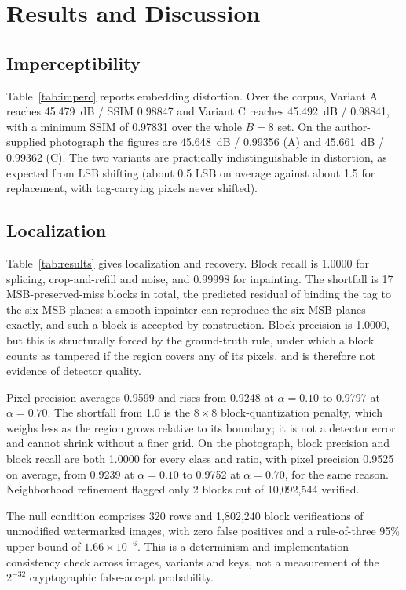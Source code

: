 \documentclass[conference]{IEEEtran}
\begin{document}
\section{Results and Discussion}
\label{sec:results}

\subsection{Imperceptibility}
Table~\ref{tab:imperc} reports embedding distortion. Over the corpus, Variant A reaches 45.479~dB / SSIM 0.98847 and Variant C reaches 45.492~dB / 0.98841, with a minimum SSIM of 0.97831 over the whole $B=8$ set. On the author-supplied photograph the figures are 45.648~dB / 0.99356 (A) and 45.661~dB / 0.99362 (C). The two variants are practically indistinguishable in distortion, as expected from LSB shifting (about 0.5 LSB on average against about 1.5 for replacement, with tag-carrying pixels never shifted).

\subsection{Localization}
Table~\ref{tab:results} gives localization and recovery. Block recall is 1.0000 for splicing, crop-and-refill and noise, and 0.99998 for inpainting. The shortfall is 17 MSB-preserved-miss blocks in total, the predicted residual of binding the tag to the six MSB planes: a smooth inpainter can reproduce the six MSB planes exactly, and such a block is accepted by construction. Block precision is 1.0000, but this is structurally forced by the ground-truth rule, under which a block counts as tampered if the region covers any of its pixels, and is therefore not evidence of detector quality.

Pixel precision averages 0.9599 and rises from 0.9248 at $\alpha=0.10$ to 0.9797 at $\alpha=0.70$. The shortfall from 1.0 is the $8\times8$ block-quantization penalty, which weighs less as the region grows relative to its boundary; it is not a detector error and cannot shrink without a finer grid. On the photograph, block precision and block recall are both 1.0000 for every class and ratio, with pixel precision 0.9525 on average, from 0.9239 at $\alpha=0.10$ to 0.9752 at $\alpha=0.70$, for the same reason. Neighborhood refinement flagged only 2 blocks out of 10,092,544 verified.

The null condition comprises 320 rows and 1,802,240 block verifications of unmodified watermarked images, with zero false positives and a rule-of-three 95\% upper bound of $1.66\times10^{-6}$. This is a determinism and implementation-consistency check across images, variants and keys, not a measurement of the $2^{-32}$ cryptographic false-accept probability.
\end{document}
